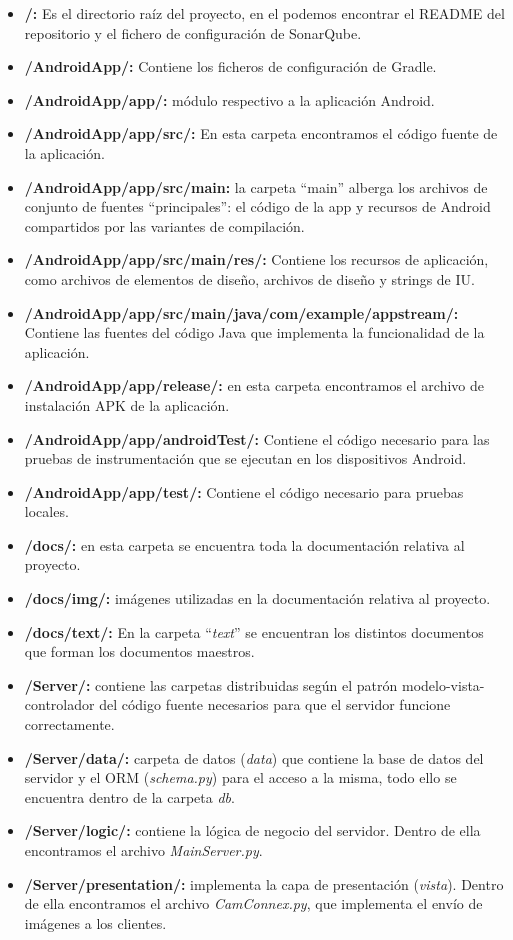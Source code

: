 \begin{itemize}
\item
	\textbf{/:} Es el directorio raíz del proyecto, en el podemos encontrar el README del repositorio y el fichero de configuración de SonarQube.
\item
	\textbf{/AndroidApp/:} Contiene los ficheros de configuración de Gradle.
\item
	\textbf{/AndroidApp/app/:} módulo respectivo a la aplicación Android.
\item
	\textbf{/AndroidApp/app/src/:} En esta carpeta encontramos el código fuente de la aplicación.
\item
	\textbf{/AndroidApp/app/src/main:} la carpeta ``main'' alberga los archivos de conjunto de fuentes ``principales'': el código de la app y recursos de Android compartidos por las variantes de compilación.
\item
	\textbf{/AndroidApp/app/src/main/res/:} Contiene los recursos de aplicación, como archivos de elementos de diseño, archivos de diseño y strings de IU.
\item
	\textbf{/AndroidApp/app/src/main/java/com/example/appstream/:} Contiene las fuentes del código Java que implementa la funcionalidad de la aplicación.
\item
	\textbf{/AndroidApp/app/release/:} en esta carpeta encontramos el archivo de instalación APK de la aplicación.
\item
	\textbf{/AndroidApp/app/androidTest/:} Contiene el código necesario para las pruebas de instrumentación que se ejecutan en los dispositivos Android.
\item
	\textbf{/AndroidApp/app/test/:} Contiene el código necesario para pruebas locales.
\item
	\textbf{/docs/:} en esta carpeta se encuentra toda la documentación relativa al proyecto.
\item
	\textbf{/docs/img/:} imágenes utilizadas en la documentación relativa al proyecto.
\item
	\textbf{/docs/text/:} En la carpeta ``\textit{text}'' se encuentran los distintos documentos que forman los documentos maestros.
\item
	\textbf{/Server/:} contiene las carpetas distribuidas según el patrón modelo-vista-controlador del código fuente necesarios para que el servidor funcione correctamente.
\item
	\textbf{/Server/data/:} carpeta de datos (\textit{data}) que contiene la base de datos del servidor y el ORM (\textit{schema.py}) para el acceso a la misma, todo ello se encuentra dentro de la carpeta \textit{db}.
\item
	\textbf{/Server/logic/:} contiene la lógica de negocio del servidor. 
	Dentro de ella encontramos el archivo \textit{MainServer.py}.
\item
	\textbf{/Server/presentation/:} implementa la capa de presentación (\textit{vista}).
	Dentro de ella encontramos el archivo \textit{CamConnex.py}, que implementa el envío de imágenes a los clientes.
\end{itemize}

